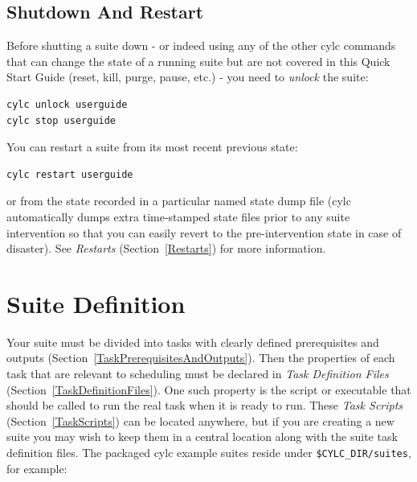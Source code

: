 \documentclass[11pt,a4paper]{article}
\begin{document}
\lstset{language=bash}
\subsection{Shutdown And Restart}
\label{QuickShutdownAndRestart}

\lstset{language=bash}

Before shutting a suite down - or indeed using any of the other cylc
commands that can change the state of a running suite but are not 
covered in this Quick Start Guide (reset, kill, purge, pause, etc.) -
you need to {\em unlock} the suite:

\begin{lstlisting}
cylc unlock userguide
cylc stop userguide
\end{lstlisting}

You can restart a suite from its most recent previous state:

\begin{lstlisting}
cylc restart userguide
\end{lstlisting}
or from the state recorded in a particular named state dump file 
(cylc automatically dumps extra time-stamped state files prior to any
suite intervention so that you can easily revert to the
pre-intervention state in case of disaster). See {\em Restarts}
(Section~\ref{Restarts}) for more information.

\pagebreak
\section{Suite Definition} 
\label{SuiteDefinition}


Your suite must be divided into tasks with clearly defined
prerequisites and outputs (Section~\ref{TaskPrerequisitesAndOutputs}). Then
the properties of each task that are relevant to scheduling must be
declared in {\em Task Definition Files}
(Section~\ref{TaskDefinitionFiles}). One such property is the script or
executable that should be called to run the real task when
it is ready to run. These {\em Task Scripts} (Section~\ref{TaskScripts})
can be located anywhere, but if you are creating a new suite you may
wish to keep them in a central location along with the suite task
definition files.  The packaged cylc example suites reside under
\lstinline=$CYLC_DIR/suites=, for
example:
\end{document}
